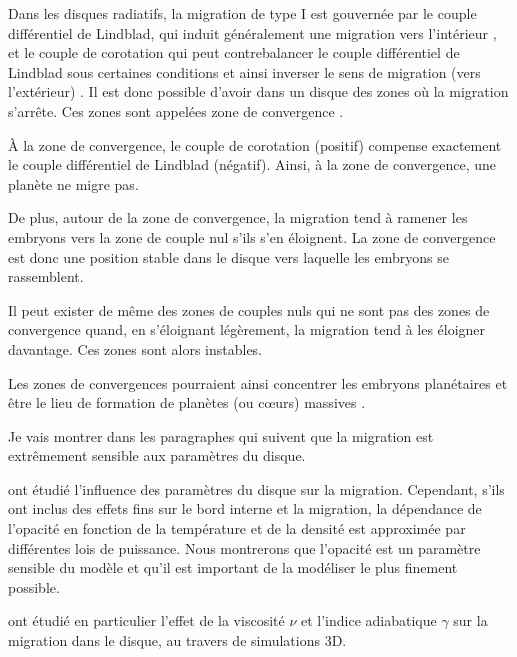 Dans les disques radiatifs, la migration de type I est gouvernée par le couple différentiel de Lindblad, qui induit généralement
une migration vers l'intérieur \citep{goldreich1980disk, ward1986density, tanaka2002three}, et le couple de corotation qui peut contrebalancer le couple
différentiel de Lindblad sous certaines conditions et ainsi inverser le sens de migration (vers l'extérieur)
\citep{paardekooper2006halting, kley2008migration}. Il est donc possible d'avoir dans un disque des zones où la migration
s'arrête. Ces zones sont appelées zone de convergence \citep[CZs;][]{lyra2010orbital,
paardekooper2011torque, hellary2012global}. 

\bigskip

À la zone de convergence, le couple de corotation (positif) compense exactement le couple différentiel de Lindblad (négatif).
Ainsi, à la zone de convergence, une planète ne migre pas.

De plus, autour de la zone de convergence, la migration tend à ramener les embryons vers la zone de couple nul s'ils s'en
éloignent. La zone de convergence est donc une position stable dans le disque vers laquelle les embryons se rassemblent.

Il peut exister de même des zones de couples nuls qui ne sont pas des zones de convergence quand, en s'éloignant légèrement, la
migration tend à les éloigner davantage. Ces zones sont alors instables.

Les zones de convergences pourraient ainsi concentrer les embryons planétaires et être le lieu de formation de planètes (ou
cœurs) massives \citep{lyra2010orbital, horn2012orbital}. 

\bigskip

Je vais montrer dans les paragraphes qui suivent que la migration est extrêmement sensible aux paramètres du disque.

\cite{kretke2012importance} ont étudié l'influence des paramètres du disque sur la migration. Cependant, s'ils ont inclus des
effets fins sur le bord interne et la migration, la dépendance de l'opacité en fonction de la température et de la densité est
approximée par différentes lois de puissance. Nous montrerons que l'opacité est un paramètre sensible du modèle et qu'il est
important de la modéliser le plus finement possible. 

\cite{bitsch2013influence} ont étudié en particulier l'effet de la viscosité $\nu$ et l'indice adiabatique $\gamma$ sur la
migration dans le disque, au travers de simulations 3D. 


